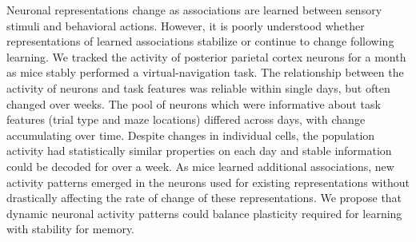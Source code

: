 
\noindent Neuronal representations change as associations are learned between sensory stimuli and behavioral actions. However, it is poorly understood whether representations of learned associations stabilize or continue to change following learning. We tracked the activity of posterior parietal cortex neurons for a month as mice stably performed a virtual-navigation task. The relationship between the activity of neurons and task features was reliable within single days, but often changed over weeks. The pool of neurons which were informative about task features (trial type and maze locations) differed across days, with change accumulating over time. Despite changes in individual cells, the population activity had statistically similar properties on each day and stable information could be decoded for over a week. As mice learned additional associations, new activity patterns emerged in the neurons used for existing representations without drastically affecting the rate of change of these representations. We propose that dynamic neuronal activity patterns could balance plasticity required for learning with stability for memory.